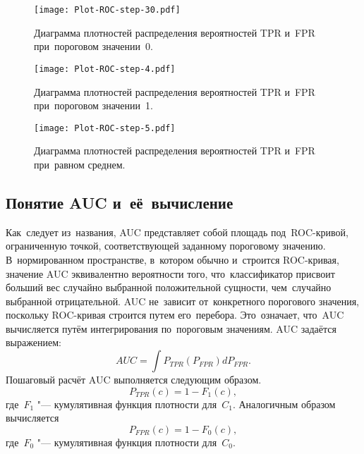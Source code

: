 \documentclass[]{scrreprt}
\begin{document}
\clearpage
%
\begin{figure}[ht]
	\centering
	\texttt{[image: Plot-ROC-step-30.pdf]}
	\caption{Диаграмма плотностей распределения вероятностей TPR и~FPR при~пороговом значении~0.}
	\label{fig:plot-TPR-FPR-prob-density-3}
\end{figure}
%
\begin{figure}[ht]
	\centering
	\texttt{[image: Plot-ROC-step-4.pdf]}
	\caption{Диаграмма плотностей распределения вероятностей TPR и~FPR при~пороговом значении~1.}
	\label{fig:plot-TPR-FPR-prob-density-4}
\end{figure}
%
\begin{figure}[ht]
	\centering
	\texttt{[image: Plot-ROC-step-5.pdf]}
	\caption{Диаграмма плотностей распределения вероятностей TPR и~FPR при~равном среднем.}
	\label{fig:plot-TPR-FPR-prob-density-5}
\end{figure}
%
\subsection{Понятие AUC и~её~вычисление}
Как~следует из~названия, AUC представляет собой площадь под~ROC-кривой, ограниченную точкой, соответствующей заданному пороговому значению. В~нормированном пространстве, в~котором обычно и~строится ROC-кривая, значение AUC эквивалентно вероятности того, что~классификатор присвоит больший вес случайно выбранной положительной сущности, чем~случайно выбранной отрицательной. AUC не~зависит от~конкретного порогового значения, поскольку ROC-кривая строится путем его~перебора. Это~означает, что~AUC вычисляется путём интегрирования по~пороговым значениям. AUC задаётся выражением:
\begin{equation}\label{eq:AUC-computation-0}
AUC = \int P_{TPR}(P_{FPR}) d P_{FPR}.
\end{equation}
Пошаговый расчёт AUC выполняется следующим образом.
\begin{equation}\label{eq:AUC-computation-1}
P_{TPR}(c) = 1 - F_{1}(c),
\end{equation}
где~$F_{1}$ "--- кумулятивная функция плотности для~$C_{1}$. Аналогичным образом вычисляется
\begin{equation}\label{eq:AUC-computation-2}
P_{FPR}(c) = 1 - F_{0}(c),
\end{equation}
где~$F_{0}$ "--- кумулятивная функция плотности для~$C_{0}$.
\end{document}
